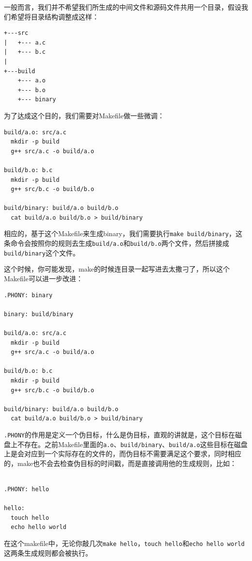 \documentclass[lang=cn,11pt,a4paper]{elegantpaper}
\begin{document}
一般而言，我们并不希望我们所生成的中间文件和源码文件共用一个目录，假设我们希望将目录结构调整成这样：
\begin{lstlisting}
+---src
|   +--- a.c
|   +--- b.c
|
+---build
    +--- a.o
    +--- b.o
    +--- binary
\end{lstlisting}

为了达成这个目的，我们需要对Makefile做一些微调：
\begin{lstlisting}
build/a.o: src/a.c
  mkdir -p build
  g++ src/a.c -o build/a.o

build/b.o: b.c
  mkdir -p build
  g++ src/b.c -o build/b.o

build/binary: build/a.o build/b.o
  cat build/a.o build/b.o > build/binary
\end{lstlisting}

相应的，基于这个Makefile来生成binary，我们需要执行\lstinline!make build/binary!，这条命令会按照你的规则去生成\lstinline!build/a.o!和\lstinline!build/b.o!两个文件，然后拼接成\lstinline!build/binary!这个文件。

这个时候，你可能发现，make的时候连目录一起写进去太撒刁了，所以这个Makefile可以进一步改进：

\begin{lstlisting}
.PHONY: binary

binary: build/binary

build/a.o: src/a.c
  mkdir -p build
  g++ src/a.c -o build/a.o

build/b.o: b.c
  mkdir -p build
  g++ src/b.c -o build/b.o

build/binary: build/a.o build/b.o
  cat build/a.o build/b.o > build/binary
\end{lstlisting}

\lstinline!.PHONY!的作用是定义一个伪目标，什么是伪目标，直观的讲就是，这个目标在磁盘上不存在。之前Makefile里面的\lstinline!a.o!、\lstinline!build/binary!、\lstinline!build/a.o!这些目标在磁盘上是会对应到一个实际存在的文件的，而伪目标不需要满足这个要求，同时相应的，make也不会去检查伪目标的时间戳，而是直接调用他的生成规则，比如：

\begin{lstlisting}

.PHONY: hello

hello:
  touch hello
  echo hello world
\end{lstlisting}

在这个makefile中，无论你敲几次\lstinline!make hello!，\lstinline!touch hello!和\lstinline!echo hello world!这两条生成规则都会被执行。
\end{document}
